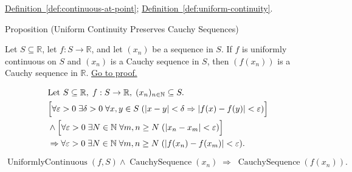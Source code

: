 \begin{dependencies}
\hyperref[def:continuous-at-point]{Definition~\ref*{def:continuous-at-point}};\;
\hyperref[def:uniform-continuity]{Definition~\ref*{def:uniform-continuity}}.
\end{dependencies}


\begin{propositionbox}{Proposition (Uniform Continuity Preserves Cauchy Sequences)}
\begin{proposition}
\label{prop:uniform-continuity-cauchy}
Let $S \subseteq \mathbb{R}$, let $f:S \to \mathbb{R}$, and let $(x_n)$ be a sequence in $S$. If $f$ is uniformly continuous on $S$ and $(x_n)$ is a Cauchy sequence in $S$, then $(f(x_n))$ is a Cauchy sequence in $\mathbb{R}$.
\hyperref[prf:uniform-continuity-cauchy]{Go to proof.}
\end{proposition}
\end{propositionbox}

\begin{remark*}
\[
\begin{aligned}
&\text{Let } S \subseteq \mathbb{R},\; f:S \to \mathbb{R},\; (x_n)_{n\in\mathbb{N}}\subseteq S.\\
&\Bigl[\forall \varepsilon>0\;\exists \delta>0\;\forall x,y \in S\;( |x-y|<\delta \Rightarrow |f(x)-f(y)|<\varepsilon )\Bigr]\\
&\land \Bigl[\forall \varepsilon>0\;\exists N \in \mathbb{N}\;\forall m,n \ge N\;( |x_n - x_m|<\varepsilon )\Bigr]\\
&\Rightarrow \forall \varepsilon>0\;\exists N \in \mathbb{N}\;\forall m,n \ge N\;( |f(x_n) - f(x_m)|<\varepsilon ).
\end{aligned}
\]
\end{remark*}

\begin{remark*}
\[
\operatorname{UniformlyContinuous}(f,S) \land \operatorname{CauchySequence}(x_n) \;\Rightarrow\; \operatorname{CauchySequence}(f(x_n)).
\]
\end{remark*}

